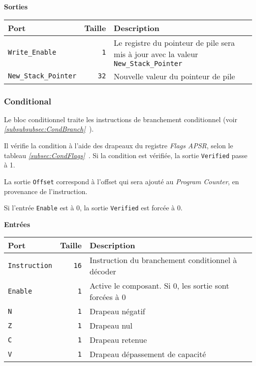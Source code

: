 \vspace{1em}
\textbf{Sorties}\\

\begin{tabular}{|l|r|l|}
\hline 
\textbf{Port} & \textbf{Taille} & \textbf{Description}\\
\hline

\hline
\texttt{Write\_Enable}		&  \texttt{1} & Le registre du pointeur de pile sera mis à jour avec la valeur \texttt{New\_Stack\_Pointer}\\
\hline
\texttt{New\_Stack\_Pointer}	&  \texttt{32} & Nouvelle valeur du pointeur de pile\\

\hline
\end{tabular}




\subsubsection{Conditional}


Le bloc conditionnel traite les instructions de branchement conditionnel (voir \textit{\ref{subsubsubsec:CondBranch}~}).

Il vérifie la condition à l'aide des drapeaux du registre \textit{Flags APSR}, selon le tableau  \textit{\ref{subsec:CondFlags}~}.
Si la condition est vérifiée, la sortie \texttt{Verified} passe à 1.

La sortie \texttt{Offset} correspond à l'offset qui sera ajouté au \textit{Program Counter}, en provenance de l'instruction.

Si l'entrée \texttt{Enable} est à 0, la sortie \texttt{Verified} est forcée à 0.


\textbf{Entrées}\\

\begin{tabular}{|l|r|l|}
\hline
\textbf{Port}		& \textbf{Taille} & \textbf{Description}\\
\hline

\texttt{Instruction}	& \texttt{16} & Instruction du branchement conditionnel à décoder\\
\hline
\texttt{Enable}		&  \texttt{1} & Active le composant. Si 0, les sortie sont forcées à 0\\
\hline
\texttt{N}		&  \texttt{1} & Drapeau négatif\\
\hline
\texttt{Z}		&  \texttt{1} & Drapeau nul\\
\hline
\texttt{C}		&  \texttt{1} & Drapeau retenue\\
\hline
\texttt{V}		&  \texttt{1} & Drapeau dépassement de capacité\\


\hline
\end{tabular}

